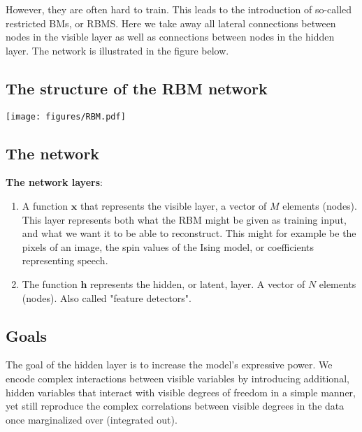 \documentclass[aip,jcp,reprint,floatfix]{revtex4-1}
\begin{document}
\begin{itemize}
However, they are often hard to train. This leads to the introduction of so-called restricted BMs, or RBMS.
Here we take away all lateral connections between nodes in the visible layer as well as connections between nodes in the hidden layer. The network is illustrated in the figure below.



\subsection*{The structure of the RBM network}



\vspace{6mm}

\centerline{\texttt{[image: figures/RBM.pdf]}}

\vspace{6mm}





\subsection*{The network}

\textbf{The network layers}:
\begin{enumerate}
 \item A function $\mathbf{x}$ that represents the visible layer, a vector of $M$ elements (nodes). This layer represents both what the RBM might be given as training input, and what we want it to be able to reconstruct. This might for example be the pixels of an image, the spin values of the Ising model, or coefficients representing speech.

 \item The function $\mathbf{h}$ represents the hidden, or latent, layer. A vector of $N$ elements (nodes). Also called "feature detectors".
\end{enumerate}

\noindent
\subsection*{Goals}

The goal of the hidden layer is to increase the model's expressive power. We encode complex interactions between visible variables by introducing additional, hidden variables that interact with visible degrees of freedom in a simple manner, yet still reproduce the complex correlations between visible degrees in the data once marginalized over (integrated out).


\end{itemize}
\end{document}
